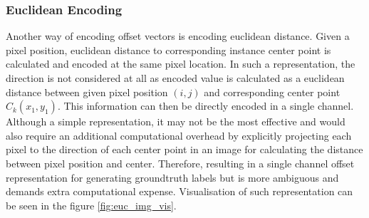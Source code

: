 \subsubsection{Euclidean Encoding}

Another way of encoding offset vectors is encoding euclidean distance. Given a pixel position, euclidean distance to corresponding instance center point is calculated and encoded at the same pixel location.  In such a representation, the direction is not considered at all as encoded value is calculated as a euclidean distance between given pixel position $(i,j)$ and corresponding center point $C_{k}(x_{1}, y_{1})$. This information can then be directly encoded in a single channel. Although a simple representation, it may not be the most effective and would also require an additional computational overhead by explicitly projecting each pixel to the direction of each center point in an image for calculating the distance between pixel position and center. Therefore, resulting in a single channel offset representation for generating groundtruth labels but is more ambiguous and demands extra computational expense. Visualisation of such representation can be seen in the figure \ref{fig:euc_img_vis}.

